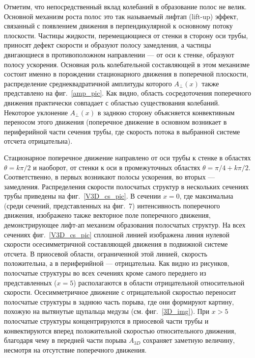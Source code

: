 Отметим, что непосредственный вклад колебаний в образование полос не велик. Основной механизм роста полос это так называемый лифтап (lift-up) эффект, связанный с появлением движения в перпендикулярной к основному потоку плоскости. Частицы жидкости, перемещающиеся от стенки в сторону оси трубы, приносят дефект скорости и образуют полосу замедления, а частицы двигающиеся в противоположном направлении --- от оси к стенке, образуют полосу ускорения. Основная роль колебательной составляющей в этом механизме состоит именно в порождении стационарного движения в поперечной плоскости, распределение среднеквадратичной амплитуды которого $A_\bot(x)$ также представлено на фиг.~\ref{amp_pic}. Как видно, область сосредоточения поперечного движения практически совпадает с областью существования колебаний. Некоторое уклонение $A_\bot(x)$ в заднюю сторону объясняется конвективным переносом этого движения (поперечное движение в основном возникает в периферийной части сечения трубы, где скорость потока в выбранной системе отсчета отрицательна).

Стационарное поперечное движение направлено от оси трубы к стенке в областях $\theta=k\pi/2$ и наоборот, от стенки к оси в промежуточных областях $\theta=\pi/4+k\pi/2$. Соответственно, в первых возникают полосы ускорения, во вторых --- замедления. Распределения скорости полосчатых структур в нескольких сечениях трубы приведены на фиг.~\ref{V3D_cs_pic}. В сечении $x=0$, где максимальна (среди сечений, представленных на фиг.~7) интенсивность поперечного движения, изображено также векторное поле поперечного движения, демонстрирующее лифт-ап механизм образования полосчатых структур. На всех сечениях фиг.~\ref{V3D_cs_pic} сплошной линией изображена линия нулевой скорости осесимметричной составляющей движения в подвижной системе отсчета. В приосевой области, ограниченной этой линией, скорость положительна, а в периферийной --- отрицательна. Как видно из рисунков, полосчатые структуры во всех сечениях кроме самого переднего из представленных ($x=5$) располагаются в области отрицательной относительной скорости. Осесимметричное движение с отрицательной скоростью переносит полосчатые структуры в заднюю часть порыва, где они формируют картину, похожую на вытянутые щупальца медузы (см. фиг.~\ref{3D_img}). При $x>5$ полосчатые структуры концентрируются в приосевой части трубы и конвектируются вперед положительной скоростью относительного движения, благодаря чему в передней части порыва $A_{3D}$ сохраняет заметную величину, несмотря на отсутствие поперечного движения.


